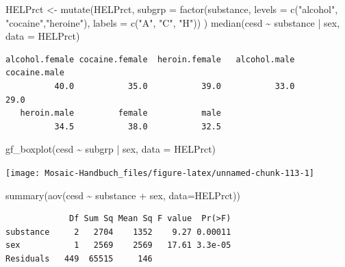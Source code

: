 \documentclass[
  ngerman,
]{scrbook}
\newenvironment{Shaded}{\begin{snugshade}}{\end{snugshade}}
\newcommand{\AttributeTok}[1]{\textcolor[rgb]{0.77,0.63,0.00}{#1}}
\newcommand{\FunctionTok}[1]{\textcolor[rgb]{0.00,0.00,0.00}{#1}}
\newcommand{\NormalTok}[1]{#1}
\newcommand{\OtherTok}[1]{\textcolor[rgb]{0.56,0.35,0.01}{#1}}
\newcommand{\SpecialCharTok}[1]{\textcolor[rgb]{0.00,0.00,0.00}{#1}}
\newcommand{\StringTok}[1]{\textcolor[rgb]{0.31,0.60,0.02}{#1}}
\begin{document}
\begin{Shaded}
\begin{Highlighting}[]
\NormalTok{HELPrct }\OtherTok{\textless{}{-}} \FunctionTok{mutate}\NormalTok{(HELPrct, }
                  \AttributeTok{subgrp =} \FunctionTok{factor}\NormalTok{(substance,}
                                  \AttributeTok{levels =} \FunctionTok{c}\NormalTok{(}\StringTok{"alcohol"}\NormalTok{, }\StringTok{"cocaine"}\NormalTok{,}\StringTok{"heroine"}\NormalTok{),}
                                  \AttributeTok{labels =} \FunctionTok{c}\NormalTok{(}\StringTok{"A"}\NormalTok{, }\StringTok{"C"}\NormalTok{, }\StringTok{"H"}\NormalTok{))}
\NormalTok{                  )}
\FunctionTok{median}\NormalTok{(cesd }\SpecialCharTok{\textasciitilde{}}\NormalTok{ substance }\SpecialCharTok{|}\NormalTok{ sex, }\AttributeTok{data =}\NormalTok{ HELPrct)}
\end{Highlighting}
\end{Shaded}

\begin{verbatim}
alcohol.female cocaine.female  heroin.female   alcohol.male   cocaine.male 
          40.0           35.0           39.0           33.0           29.0 
   heroin.male         female           male 
          34.5           38.0           32.5 
\end{verbatim}

\begin{Shaded}
\begin{Highlighting}[]
\FunctionTok{gf\_boxplot}\NormalTok{(cesd }\SpecialCharTok{\textasciitilde{}}\NormalTok{ subgrp }\SpecialCharTok{|}\NormalTok{ sex, }\AttributeTok{data =}\NormalTok{ HELPrct)}
\end{Highlighting}
\end{Shaded}

\begin{center}\texttt{[image: Mosaic-Handbuch\_files/figure-latex/unnamed-chunk-113-1]} \end{center}

\begin{Shaded}
\begin{Highlighting}[]
\FunctionTok{summary}\NormalTok{(}\FunctionTok{aov}\NormalTok{(cesd }\SpecialCharTok{\textasciitilde{}}\NormalTok{ substance }\SpecialCharTok{+}\NormalTok{ sex, }\AttributeTok{data=}\NormalTok{HELPrct))}
\end{Highlighting}
\end{Shaded}

\begin{verbatim}
             Df Sum Sq Mean Sq F value  Pr(>F)
substance     2   2704    1352    9.27 0.00011
sex           1   2569    2569   17.61 3.3e-05
Residuals   449  65515     146                
\end{verbatim}
\end{document}
